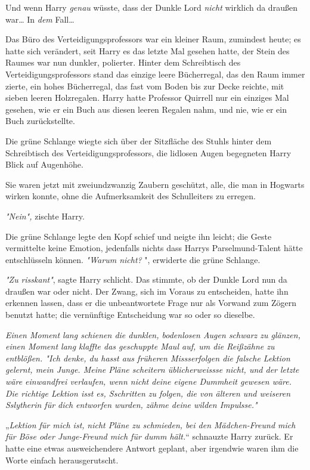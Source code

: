 {Und wenn Harry \emph{genau} wüsste, dass der Dunkle Lord \emph{nicht} wirklich da draußen war… In \emph{dem} Fall…

Das Büro des Verteidigungsprofessors war ein kleiner Raum, zumindest heute; es hatte sich verändert, seit Harry es das letzte Mal gesehen hatte, der Stein des Raumes war nun dunkler, polierter. Hinter dem Schreibtisch des Verteidigungsprofessors stand das einzige leere Bücherregal, das den Raum immer zierte, ein hohes Bücherregal, das fast vom Boden bis zur Decke reichte, mit sieben leeren Holzregalen. Harry hatte Professor Quirrell nur ein einziges Mal gesehen, wie er ein Buch aus diesen leeren Regalen nahm, und nie, wie er ein Buch zurückstellte.

Die grüne Schlange wiegte sich über der Sitzfläche des Stuhls hinter dem Schreibtisch des Verteidigungsprofessors, die lidlosen Augen begegneten Harry Blick auf Augenhöhe.

Sie waren jetzt mit zweiundzwanzig Zaubern geschützt, alle, die man in Hogwarts wirken konnte, ohne die Aufmerksamkeit des Schulleiters zu erregen.

\emph{"Nein",} zischte Harry.

Die grüne Schlange legte den Kopf schief und neigte ihn leicht; die Geste vermittelte keine Emotion, jedenfalls nichts dass Harrys Parselmund-Talent hätte entschlüsseln können. \emph{"Warum nicht?} ", erwiderte die grüne Schlange.

\emph{"Zu} \emph{risskant"}, sagte Harry schlicht. Das stimmte, ob der Dunkle Lord nun da draußen war oder nicht. Der Zwang, sich im Voraus zu entscheiden, hatte ihn erkennen lassen, dass er die unbeantwortete Frage nur als Vorwand zum Zögern benutzt hatte; die vernünftige Entscheidung war so oder so dieselbe.

\emph{Einen Moment lang schienen die dunklen, bodenlosen Augen schwarz zu glänzen, einen Moment lang klaffte das geschuppte Maul auf, um die Reißzähne zu entblößen. \emph{"Ich denke, du} \emph{hasst} \emph{aus früheren} \emph{Missserfolgen} \emph{die} \emph{falsche Lektion gelernt, mein Junge. Meine Pläne} \emph{scheitern} \emph{üblicherweissse} \emph{nicht, und der letzte wäre einwandfrei verlaufen, wenn nicht deine eigene Dummheit gewesen wäre. Die richtige Lektion isst es,} \emph{Sschritten} \emph{zu folgen, die von älteren und weiseren} \emph{Sslytherin} \emph{für dich entworfen wurden,} \emph{zähme} \emph{deine wilden} \emph{Impulsse."}}

„\emph{Lektion für mich ist,} \emph{nicht Pläne zu schmieden, bei den Mädchen-Freund mich für Böse oder Junge-Freund mich für dumm hält.}“ schnauzte Harry zurück. Er hatte eine etwas ausweichendere Antwort geplant, aber irgendwie waren ihm die Worte einfach herausgerutscht.

}
